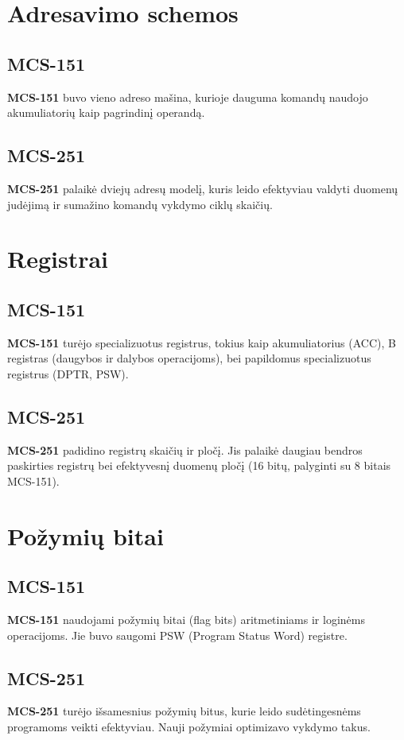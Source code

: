 \documentclass[a4paper,12pt]{article}
\begin{document}
\newpage

\section{Adresavimo schemos}
\subsection{MCS-151}
\textbf{MCS-151} buvo vieno adreso mašina, kurioje dauguma komandų naudojo akumuliatorių kaip pagrindinį operandą.

\subsection{MCS-251}
\textbf{MCS-251} palaikė dviejų adresų modelį, kuris leido efektyviau valdyti duomenų judėjimą ir sumažino komandų vykdymo ciklų skaičių.



\section{Registrai}
\subsection{MCS-151}
\textbf{MCS-151} turėjo specializuotus registrus, tokius kaip akumuliatorius (ACC), B registras (daugybos ir dalybos operacijoms), bei papildomus specializuotus registrus (DPTR, PSW).

\subsection{MCS-251}
\textbf{MCS-251} padidino registrų skaičių ir pločį. Jis palaikė daugiau bendros paskirties registrų bei efektyvesnį duomenų pločį (16 bitų, palyginti su 8 bitais MCS-151).

\newpage
 
\section{Požymių bitai}
\subsection{MCS-151}
\textbf{MCS-151} naudojami požymių bitai (flag bits) aritmetiniams ir loginėms operacijoms. Jie buvo saugomi PSW (Program Status Word) registre.

\subsection{MCS-251}
\textbf{MCS-251} turėjo išsamesnius požymių bitus, kurie leido sudėtingesnėms programoms veikti efektyviau. Nauji požymiai optimizavo vykdymo takus.
\end{document}
